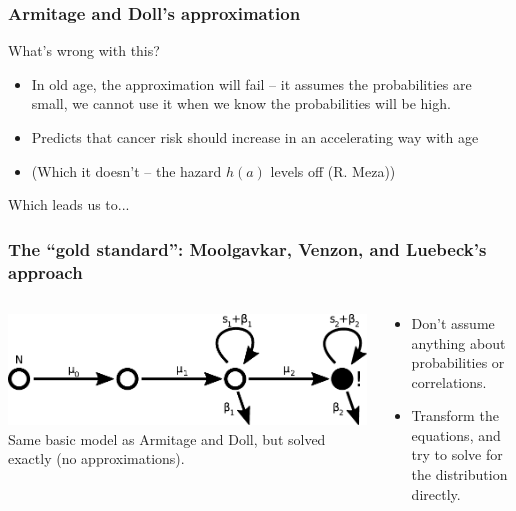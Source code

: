 \documentclass{beamer}
\begin{document}
\begin{frame}
    \frametitle{Armitage and Doll's approximation}

    What's wrong with this?
    \begin{itemize}
        \item In old age, the approximation will fail -- it assumes the probabilities
        are small, we cannot use it when we know the probabilities will be high.
        \item Predicts that cancer risk should increase in an accelerating way with age
        \item (Which it doesn't -- the hazard $h(a)$ levels off (R. Meza))
    \end{itemize}

    Which leads us to...
\end{frame}


\begin{frame}
    \frametitle{The ``gold standard'': Moolgavkar, Venzon, and Luebeck's approach}

    \begin{columns}
        \begin{column}{0.5\textwidth}
            \includegraphics[width=1.00\textwidth]{figures/diagram3}
            Same basic model as Armitage and Doll, but solved exactly (no
            approximations).
        \end{column}
        \begin{column}{0.5\textwidth}
        \begin{itemize}
            \item Don't assume anything about probabilities or correlations.
            \item Transform the equations, and try to solve for the distribution directly.
        \end{itemize}
        \end{column}
    \end{columns}
\end{frame}
\end{document}

